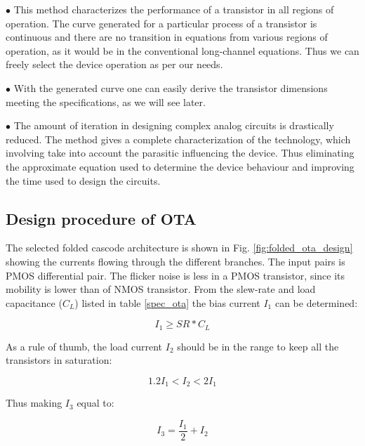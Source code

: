 $\bullet$ This method characterizes the performance of a transistor in all regions of operation. The curve generated for a particular process of a transistor is continuous and there are no transition in equations from various regions of operation, as it would be in the conventional long-channel equations. Thus we can freely select the device operation as per our needs. 

$\bullet$ With the generated curve one can easily derive the transistor dimensions meeting the specifications, as we will see later. 

$\bullet$ The amount of iteration in designing complex analog circuits is drastically reduced. The method gives a complete characterization of the technology, which involving take into account the parasitic influencing the device. Thus eliminating the approximate equation used to determine the device behaviour and improving the time used to design the circuits. 

\subsection{Design procedure of OTA}

The selected folded cascode architecture is shown in Fig. \ref{fig:folded_ota_design} showing the currents flowing through the different branches. The input pairs is PMOS differential pair. The flicker noise is less in a PMOS transistor, since its mobility is lower than of NMOS transistor\cite{Johns}. From the slew-rate and load capacitance ($C_L$) listed in table \ref{spec_ota} the bias current $I_1$ can be determined:

\begin{equation}\label{I_1}
    I_1 \geq SR*C_L
\end{equation}

As a rule of thumb, the load current $I_2$ should be in the range to keep all the transistors in saturation\cite{Razavi}:

\begin{equation}\label{I_2}
    1.2I_1<I_2<2I_1
\end{equation}

Thus making $I_3$ equal to:

\begin{equation}\label{I_3}
    I_3 = \frac{I_1}{2} + I_2
\end{equation}


